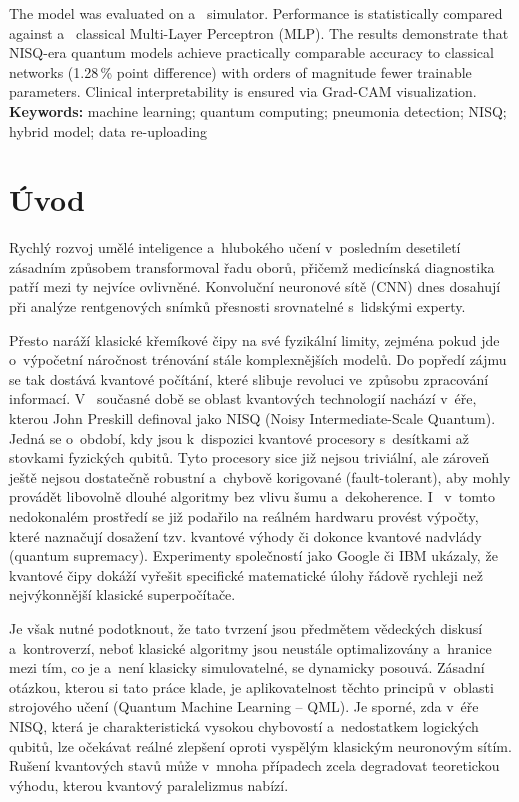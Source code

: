 \documentclass[12pt, a4paper]{report}
\begin{document}
The model was evaluated on a ~simulator. Performance is statistically compared against a ~classical Multi-Layer Perceptron (MLP). The results demonstrate that NISQ-era quantum models achieve practically comparable accuracy to classical networks (1.28\,\% point difference) with orders of magnitude fewer trainable parameters. Clinical interpretability is ensured via Grad-CAM visualization. \\

\textbf{Keywords:} machine learning; quantum computing; pneumonia detection; NISQ; hybrid model; data re-uploading


\chapter{Úvod} \label{chap:uvod}

Rychlý rozvoj umělé inteligence a~hlubokého učení v~posledním desetiletí zásadním způsobem transformoval řadu oborů, přičemž medicínská diagnostika patří mezi ty nejvíce ovlivněné. Konvoluční neuronové sítě (CNN) dnes dosahují při analýze rentgenových snímků přesnosti srovnatelné s~lidskými experty.

Přesto naráží klasické křemíkové čipy na své fyzikální limity, zejména pokud jde o~výpočetní náročnost trénování stále komplexnějších modelů. Do popředí zájmu se tak dostává kvantové počítání, které slibuje revoluci ve~způsobu zpracování informací. V ~současné době se oblast kvantových technologií nachází v~éře, kterou John Preskill definoval jako NISQ (Noisy Intermediate-Scale Quantum). Jedná se o~období, kdy jsou k~dispozici kvantové procesory s~desítkami až stovkami fyzických qubitů. Tyto procesory sice již nejsou triviální, ale zároveň ještě nejsou dostatečně robustní a~chybově korigované (fault-tolerant), aby mohly provádět libovolně dlouhé algoritmy bez vlivu šumu a~dekoherence. I ~v~tomto nedokonalém prostředí se již podařilo na reálném hardwaru provést výpočty, které naznačují dosažení tzv. kvantové výhody či dokonce kvantové nadvlády (quantum supremacy). Experimenty společností jako Google či IBM ukázaly, že kvantové čipy dokáží vyřešit specifické matematické úlohy řádově rychleji než nejvýkonnější klasické superpočítače.

Je však nutné podotknout, že tato tvrzení jsou předmětem vědeckých diskusí a~kontroverzí, neboť klasické algoritmy jsou neustále optimalizovány a~hranice mezi tím, co je a~není klasicky simulovatelné, se dynamicky posouvá. Zásadní otázkou, kterou si tato práce klade, je aplikovatelnost těchto principů v~oblasti strojového učení (Quantum Machine Learning -- QML). Je sporné, zda v~éře NISQ, která je charakteristická vysokou chybovostí a~nedostatkem logických qubitů, lze očekávat reálné zlepšení oproti vyspělým klasickým neuronovým sítím. Rušení kvantových stavů může v~mnoha případech zcela degradovat teoretickou výhodu, kterou kvantový paralelizmus nabízí.
\end{document}
